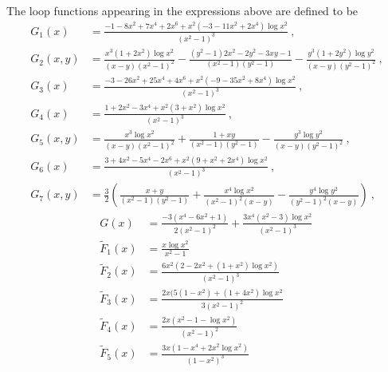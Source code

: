 \documentclass[12pt]{article}
\begin{document}
The loop functions appearing in the expressions above are defined to be
\begin{align}
G_1(x) &= \frac{-1-8x^2+7x^4+2x^6+x^2(-3-11x^2+2x^4)\log x^2}{(x^2-1)^3}\ , \\ 
G_2(x,y) &= \frac{x^3(1+2x^2)\log x^2}{(x-y)(x^2-1)^2} - \frac{(y^2-1)2x^2 - 2y^2 - 3xy -1}{(x^2-1)(y^2-1)} - \frac{y^3(1+2y^2)\log y^2}{(x-y)(y^2-1)^2} \ , \\
G_3(x) &= \frac{-3-26x^2 +25x^4 + 4x^6 + x^2(-9-35x^2+8x^4)\log x^2}{(x^2-1)^3} \ , \\
G_4(x) &= \frac{1+2x^2-3x^4+x^2(3+x^2) \log x^2}{(x^2-1)^3} \ , \\
G_5(x,y) &= \frac{x^3 \log x^2}{(x-y)(x^2-1)^2} + \frac{1+xy}{(x^2-1)(y^2-1)} - \frac{y^3 \log y^2}{(x-y)(y^2-1)^2} \ , \\
G_6(x) &= \frac{3+4x^2-5x^4 - 2x^6+x^2(9+x^2+2x^4)\log x^2}{(x^2-1)^3} \ , \\
G_7(x,y) &= \frac{3}{2}\left(\frac{x+y}{(x^2-1)(y^2-1)} + \frac{x^4 \log x^2}{(x^2-1)^2(x-y)}-  \frac{y^4 \log y^2}{(y^2-1)^2(x-y)} \right)\ ,
\end{align}
\begin{align}
G(x) &= \frac{-3(x^4-6x^2+1)}{2(x^2-1)^2}+\frac{3x^4(x^2-3)\log x^2}{(x^2-1)^3}\, \\
\tilde{F}_1(x) &= \frac{x \log x^2}{x^2-1}\, \\
\tilde{F}_2(x) &= \frac{6x^2(2-2x^2+(1+x^2)\log x^2)}{(x^2-1)^3}\, \\
\tilde{F}_3(x) &= \frac{2x(5(1-x^2) + (1+4x^2) \log x^2}{3(x^2-1)^2}\, \\
\tilde{F}_4(x) &= \frac{2x(x^2-1-\log x^2)}{(x^2-1)^2}\, \\
\tilde{F}_5(x) &= \frac{3x(1-x^4+2x^2 \log x^2)}{(1-x^2)^3}\, 
\end{align}



\end{document}
